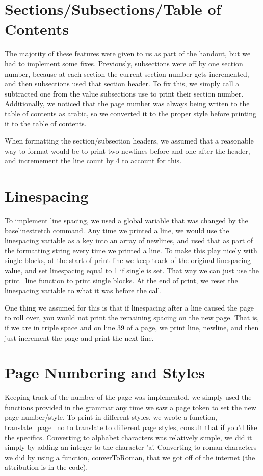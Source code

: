 \section{Sections/Subsections/Table of Contents}

The majority of these features were given to us as part of the handout, but we had to implement some fixes. Previously, subsections were off by one section number, because at each section the current section number gets incremented, and then subsections used that section header. To fix this, we simply call a subtracted one from the value subsections use to print their section number. Additionally, we noticed that the page number was always being writen to the table of contents as arabic, so we converted it to the proper style before printing it to the table of contents.

When formatting the section/subsection headers, we assumed that a reasonable way to format would be to print two newlines before and one after the header, and incremement the line count by 4 to account for this. 

\section{Linespacing}

To implement line spacing, we used a global variable that was changed by the baselinestretch command. Any time we printed a line, we would use the linespacing variable as a key into an array of newlines, and used that as part of the formatting string every time we printed a line. To make this play nicely with single blocks, at the start of print line we keep track of the original linespacing value, and set linespacing equal to 1 if single is set. That way we can just use the print\_line function to print single blocks. At the end of print, we reset the linespacing variable to what it was before the call.

One thing we assumed for this is that if linespacing after a line caused the page to roll over, you would not print the remaining spacing on the new page. That is, if we are in triple space and on line 39 of a page, we print line, newline, and then just increment the page and print the next line. 

\section{Page Numbering and Styles}

Keeping track of the number of the page was implemented, we simply used the functions provided in the grammar any time we saw a page token to set the new page number/style. To print in different styles, we wrote a function, translate_page_no to translate to different page styles, consult that if you'd like the specifics. Converting to alphabet characters was relatively simple, we did it simply by adding an integer to the character 'a'. Converting to roman characters we did by using a function, converToRoman, that we got off of the internet (the attribution is in the code). 

